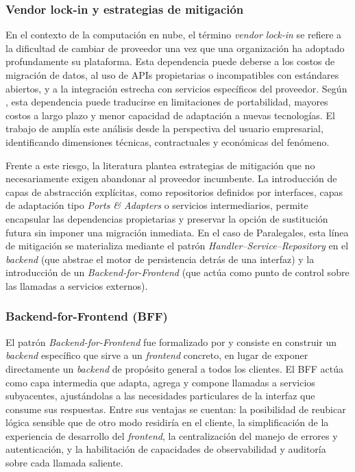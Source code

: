 \subsubsection{Vendor lock-in y estrategias de mitigación}

En el contexto de la computación en nube, el término \textit{vendor lock-in} se refiere a la dificultad de cambiar de proveedor una vez que una organización ha adoptado profundamente su plataforma. Esta dependencia puede deberse a los costos de migración de datos, al uso de APIs propietarias o incompatibles con estándares abiertos, y a la integración estrecha con servicios específicos del proveedor. Según \textcite{OparaMartins2016}, esta dependencia puede traducirse en limitaciones de portabilidad, mayores costos a largo plazo y menor capacidad de adaptación a nuevas tecnologías. El trabajo de \textcite{Harauzek2022} amplía este análisis desde la perspectiva del usuario empresarial, identificando dimensiones técnicas, contractuales y económicas del fenómeno.

Frente a este riesgo, la literatura plantea estrategias de mitigación que no necesariamente exigen abandonar al proveedor incumbente. La introducción de capas de abstracción explícitas, como repositorios definidos por interfaces, capas de adaptación tipo \textit{Ports \& Adapters} o servicios intermediarios, permite encapsular las dependencias propietarias y preservar la opción de sustitución futura sin imponer una migración inmediata. En el caso de Paralegales, esta línea de mitigación se materializa mediante el patrón \textit{Handler--Service--Repository} en el \textit{backend} (que abstrae el motor de persistencia detrás de una interfaz) y la introducción de un \textit{Backend-for-Frontend} (que actúa como punto de control sobre las llamadas a servicios externos).

\subsubsection{Backend-for-Frontend (BFF)}

El patrón \textit{Backend-for-Frontend} fue formalizado por \textcite{NewmanBFF} y consiste en construir un \textit{backend} específico que sirve a un \textit{frontend} concreto, en lugar de exponer directamente un \textit{backend} de propósito general a todos los clientes. El BFF actúa como capa intermedia que adapta, agrega y compone llamadas a servicios subyacentes, ajustándolas a las necesidades particulares de la interfaz que consume sus respuestas. Entre sus ventajas se cuentan: la posibilidad de reubicar lógica sensible que de otro modo residiría en el cliente, la simplificación de la experiencia de desarrollo del \textit{frontend}, la centralización del manejo de errores y autenticación, y la habilitación de capacidades de observabilidad y auditoría sobre cada llamada saliente.

